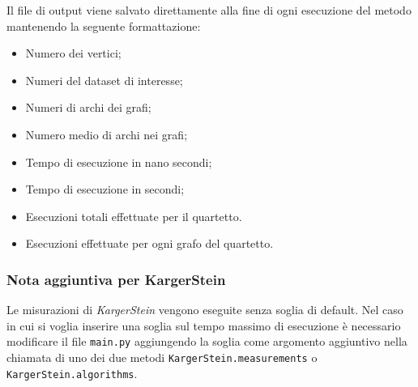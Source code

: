 Il file di output viene salvato direttamente alla fine di ogni esecuzione del metodo mantenendo la seguente formattazione:
\begin{itemize}
    \item Numero dei vertici;
    \item Numeri del dataset di interesse;
    \item Numeri di archi dei grafi;
    \item Numero medio di archi nei grafi;
    \item Tempo di esecuzione in nano secondi;
    \item Tempo di esecuzione in secondi;
    \item Esecuzioni totali effettuate per il quartetto.
    \item Esecuzioni effettuate per ogni grafo del quartetto.
\end{itemize}


\subsubsection{Nota aggiuntiva per KargerStein}

Le misurazioni di \textit{KargerStein} vengono eseguite senza soglia di default. Nel caso in cui si voglia inserire una soglia sul tempo massimo di esecuzione è necessario modificare il file \texttt{main.py} aggiungendo la soglia come argomento aggiuntivo nella chiamata di uno dei due metodi \texttt{KargerStein.measurements} o \texttt{KargerStein.algorithms}.